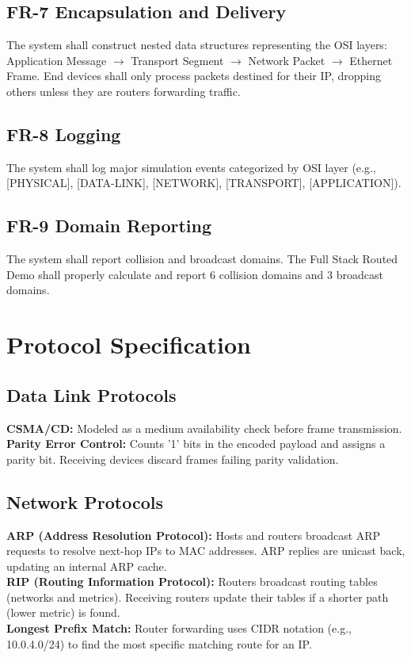 \documentclass[12pt,a4paper]{article}
\begin{document}
\subsection{FR-7 Encapsulation and Delivery}
The system shall construct nested data structures representing the OSI layers: Application Message $\rightarrow$ Transport Segment $\rightarrow$ Network Packet $\rightarrow$ Ethernet Frame. End devices shall only process packets destined for their IP, dropping others unless they are routers forwarding traffic.

\subsection{FR-8 Logging}
The system shall log major simulation events categorized by OSI layer (e.g., [PHYSICAL], [DATA-LINK], [NETWORK], [TRANSPORT], [APPLICATION]).

\subsection{FR-9 Domain Reporting}
The system shall report collision and broadcast domains. The Full Stack Routed Demo shall properly calculate and report 6 collision domains and 3 broadcast domains.

\section{Protocol Specification}

\subsection{Data Link Protocols}
\textbf{CSMA/CD:} Modeled as a medium availability check before frame transmission. \\
\textbf{Parity Error Control:} Counts '1' bits in the encoded payload and assigns a parity bit. Receiving devices discard frames failing parity validation.

\subsection{Network Protocols}
\textbf{ARP (Address Resolution Protocol):} Hosts and routers broadcast ARP requests to resolve next-hop IPs to MAC addresses. ARP replies are unicast back, updating an internal ARP cache. \\
\textbf{RIP (Routing Information Protocol):} Routers broadcast routing tables (networks and metrics). Receiving routers update their tables if a shorter path (lower metric) is found. \\
\textbf{Longest Prefix Match:} Router forwarding uses CIDR notation (e.g., 10.0.4.0/24) to find the most specific matching route for an IP.
\end{document}

